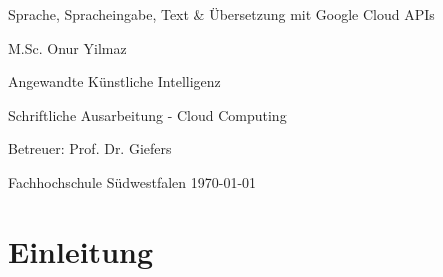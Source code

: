 \documentclass[12pt,a4paper]{article}
\begin{document}
	
		
		\begin{titlepage}
			\begin{center}
				\vspace*{1cm}
				\Huge
				Sprache, Spracheingabe, Text \& Übersetzung mit Google Cloud APIs
				
				
				\vspace{1.5cm}
				\LARGE
				M.Sc. Onur Yilmaz
				
				\vspace{1.5cm}
				\Large
				Angewandte Künstliche Intelligenz
				
				\vfill
				
				Schriftliche Ausarbeitung - Cloud Computing
				
				\vspace{0.8cm}
				\Large
				Betreuer: Prof. Dr. Giefers
				
				\vspace{0.5cm}
				\large
				Fachhochschule Südwestfalen
				\today
			\end{center}
		\end{titlepage}

\thispagestyle{empty}
\tableofcontents

\newpage
	\section{Einleitung} \cite{google}
	

\newpage
	
\end{document}
